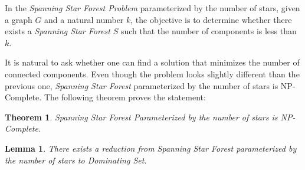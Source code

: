 \documentclass[en]{pracamgr}
\newtheorem{theorem}{Theorem}
\newtheorem{lemma}{Lemma}
\begin{document}
In the \emph{Spanning Star Forest Problem} parameterized by the number of
stars, given a graph $G$ and a natural number $k$, the objective is to
determine whether there exists a \emph{Spanning Star Forest} $S$ such that
the number of components is less than $k$.

It is natural to ask whether one can find a solution that minimizes the number
of connected components. Even though the problem looks slightly different
than the previous one, \emph{Spanning Star Forest} parameterized by the 
number of stars is NP-Complete. The following theorem proves the statement:

\begin{theorem}
	Spanning Star Forest Parameterized by the number of stars is NP-Complete.
\end{theorem}

\begin{lemma}
	There exists a reduction from Spanning Star Forest parameterized by the
	number of stars to Dominating Set.
\end{lemma}
\end{document}
